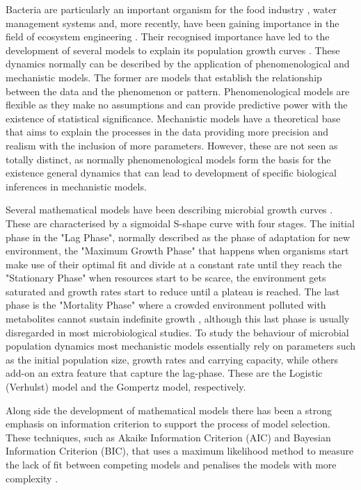 \documentclass[11]{article}
\begin{document}
Bacteria are particularly an important organism for the food industry \cite{whiting1995microbial}, water management systems \cite{pachepsky2018microbial} and, more recently, have been gaining importance in the field of ecosystem engineering \cite{graham2016microbes}.
Their recognised importance have led to the development of several models to explain its population growth curves \cite{zwietering1994modeling}. These dynamics normally can be described by the application of phenomenological and mechanistic models. The former are models that establish the relationship between the data and the phenomenon or pattern. Phenomenological models are flexible as they make no assumptions and can provide predictive power with the existence of statistical significance. Mechanistic models have a theoretical base that aims to explain the processes in the data providing more precision and realism with the inclusion of more parameters. However, these are not seen as totally distinct, as normally phenomenological models form the basis for the existence general dynamics that can lead to development of specific biological inferences in mechanistic models.

Several mathematical models have been describing microbial growth curves \cite{zwietering1994modeling}. These are characterised by a sigmoidal S-shape curve with four stages. The initial phase in the "Lag Phase", normally described as the phase of adaptation for new environment, the "Maximum Growth Phase" that happens when organisms start make use of their optimal fit and divide at a constant rate until they reach the "Stationary Phase" when resources start to be scarce, the environment gets saturated and growth rates start to reduce until a plateau is reached. The last phase is the "Mortality Phase" where a crowded environment polluted with metabolites cannot sustain indefinite growth \cite{peleg2011microbial}, although this last phase is usually disregarded in most microbiological studies. To study the behaviour of microbial population dynamics most mechanistic models essentially rely on parameters such as the initial population size, growth rates and carrying capacity, while others add-on an extra feature that capture the lag-phase. These are the Logistic (Verhulst) model and the Gompertz model, respectively.

Along side the development of mathematical models there has been a strong emphasis on information criterion to support the process of model selection. These techniques, such as Akaike Information Criterion (AIC) and Bayesian Information Criterion (BIC), that uses a maximum likelihood method to measure the lack of fit between competing models and penalises the models with more complexity \cite{johnson2004model}.
\end{document}
